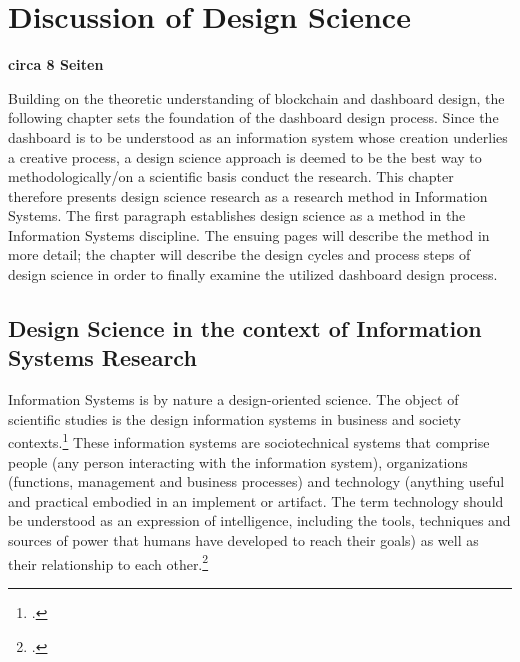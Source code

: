 \chapter{Discussion of Design Science}
\textbf{circa 8 Seiten}

Building on the theoretic understanding of blockchain and dashboard design, the following chapter sets the foundation of the dashboard design process. Since the dashboard is to be understood as an information system whose creation underlies a creative process, a design science approach is deemed to be the best way to methodologically/on a scientific basis conduct the research. This chapter therefore presents design science research as a research method in Information Systems. The first paragraph establishes design science as a method in the Information Systems discipline. The ensuing pages will describe the method in more detail; the chapter will describe the design cycles and process steps of design science in order to finally examine the utilized dashboard design process.


\section{Design Science in the context of Information Systems Research}

Information Systems is by nature a design-oriented science. The object of scientific studies is the design information systems in business and society contexts.\footcite[Cf.][p.671]{OsterleMemorandumzurgestaltungsorientierten2010} These information systems are sociotechnical systems that comprise people (any person interacting with the information system), organizations (functions, management and business processes) and technology (anything useful and practical embodied in an implement or artifact. The term technology should be understood as an expression of intelligence, including the tools, techniques and sources of power that humans have developed to reach their goals) as well as their relationship to each other.\footcites[Cf.][p.98]{HevnerDesignScienceResearch2004}[cf.][p.11]{OsterleGestaltungsorientierteWirtschaftsinformatikPladoyer2010}[cf.][p.252]{MarchDesignnaturalscience1995}

